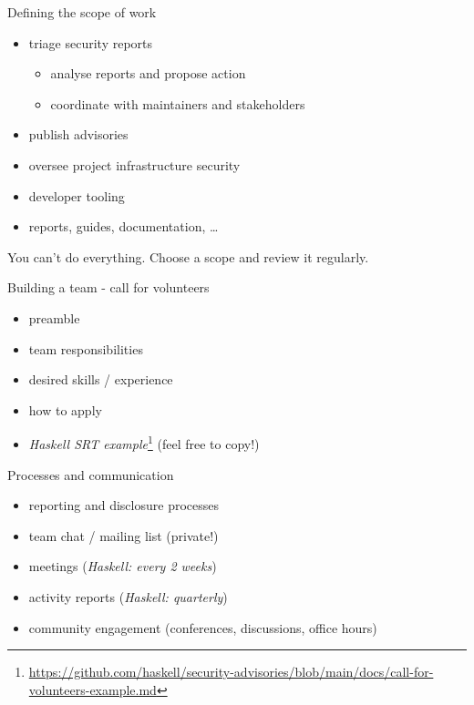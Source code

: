 \documentclass[ignorenonframetext,aspectratio=169,12pt]{beamer}
\begin{document}
\begin{frame}{Defining the scope of work}
  \begin{itemize}
    \item triage security reports
      \begin{itemize}
        \item analyse reports and propose action
        \item coordinate with maintainers and stakeholders
      \end{itemize}
    \item publish advisories
    \item oversee project infrastructure security
    \item developer tooling
    \item reports, guides, documentation, \ldots{}
  \end{itemize}

  You can't do everything.  Choose a scope and review it regularly.
\end{frame}

\begin{frame}{Building a team - call for volunteers}
  \begin{itemize}
    \item preamble
    \item team responsibilities
    \item desired skills / experience
    \item how to apply
    \item {\em Haskell SRT example}\footnote{\url{https://github.com/haskell/security-advisories/blob/main/docs/call-for-volunteers-example.md}} (feel free to copy!)
  \end{itemize}
\end{frame}

\begin{frame}{Processes and communication}
    \begin{itemize}
        \item reporting and disclosure processes
        \item team chat / mailing list (private!)
        \item meetings ({\em Haskell: every 2 weeks})
        \item activity reports ({\em Haskell: quarterly})
        \item community engagement (conferences, discussions, office hours)
    \end{itemize}
\end{frame}
\end{document}
